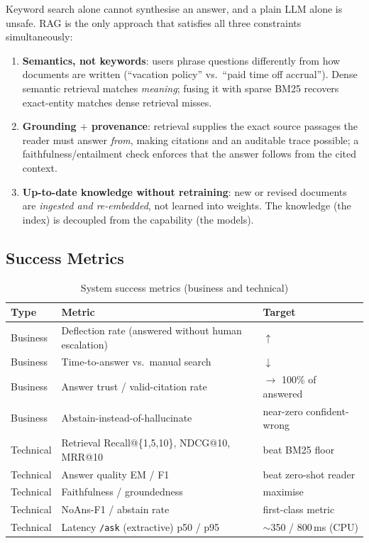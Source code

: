 \documentclass[12pt,a4paper]{article}
\begin{document}
Keyword search alone cannot synthesise an answer, and a plain LLM alone is unsafe. RAG is the only approach that satisfies all three constraints simultaneously:
\begin{enumerate}
  \item \textbf{Semantics, not keywords}: users phrase questions differently from how documents are written (``vacation policy'' vs.\ ``paid time off accrual''). Dense semantic retrieval matches \emph{meaning}; fusing it with sparse BM25 recovers exact-entity matches dense retrieval misses.
  \item \textbf{Grounding $+$ provenance}: retrieval supplies the exact source passages the reader must answer \emph{from}, making citations and an auditable trace possible; a faithfulness/entailment check enforces that the answer follows from the cited context.
  \item \textbf{Up-to-date knowledge without retraining}: new or revised documents are \emph{ingested and re-embedded}, not learned into weights. The knowledge (the index) is decoupled from the capability (the models).
\end{enumerate}

\subsection{Success Metrics}

\begin{table}[H]
\centering
\caption{System success metrics (business and technical)}
\small
\begin{tabularx}{\linewidth}{@{} l L l @{}}
\toprule
\textbf{Type} & \textbf{Metric} & \textbf{Target} \\
\midrule
Business  & Deflection rate (answered without human escalation) & $\uparrow$ \\
Business  & Time-to-answer vs.\ manual search & $\downarrow$ \\
Business  & Answer trust / valid-citation rate & $\rightarrow$ 100\% of answered \\
Business  & Abstain-instead-of-hallucinate & near-zero confident-wrong \\
Technical & Retrieval Recall@\{1,5,10\}, NDCG@10, MRR@10 & beat BM25 floor \\
Technical & Answer quality EM / F1 & beat zero-shot reader \\
Technical & Faithfulness / groundedness & maximise \\
Technical & NoAns-F1 / abstain rate & first-class metric \\
Technical & Latency \texttt{/ask} (extractive) p50 / p95 & $\sim$350 / 800\,ms (CPU) \\
\bottomrule
\end{tabularx}
\end{table}
\end{document}
